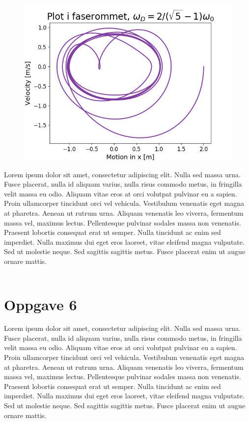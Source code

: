 \documentclass[norsk,a4paper,12pt]{article}
\begin{document}
\begin{figure}
\includegraphics[scale=0.8]{Oppgave5del2.png}
\end{figure}

Lorem ipsum dolor sit amet, consectetur adipiscing elit. Nulla sed massa urna. Fusce placerat, nulla id aliquam varius, nulla risus commodo metus, in fringilla velit massa eu odio. Aliquam vitae eros at orci volutpat pulvinar eu a sapien. Proin ullamcorper tincidunt orci vel vehicula. Vestibulum venenatis eget magna at pharetra. Aenean ut rutrum urna. Aliquam venenatis leo viverra, fermentum massa vel, maximus lectus. Pellentesque pulvinar sodales massa non venenatis. Praesent lobortis consequat erat ut semper. Nulla tincidunt ac enim sed imperdiet. Nulla maximus dui eget eros laoreet, vitae eleifend magna vulputate. Sed ut molestie neque. Sed sagittis sagittis metus. Fusce placerat enim ut augue ornare mattis.
\\
\\

\section*{Oppgave 6}

Lorem ipsum dolor sit amet, consectetur adipiscing elit. Nulla sed massa urna. Fusce placerat, nulla id aliquam varius, nulla risus commodo metus, in fringilla velit massa eu odio. Aliquam vitae eros at orci volutpat pulvinar eu a sapien. Proin ullamcorper tincidunt orci vel vehicula. Vestibulum venenatis eget magna at pharetra. Aenean ut rutrum urna. Aliquam venenatis leo viverra, fermentum massa vel, maximus lectus. Pellentesque pulvinar sodales massa non venenatis. Praesent lobortis consequat erat ut semper. Nulla tincidunt ac enim sed imperdiet. Nulla maximus dui eget eros laoreet, vitae eleifend magna vulputate. Sed ut molestie neque. Sed sagittis sagittis metus. Fusce placerat enim ut augue ornare mattis.
\\
\\
\end{document}
